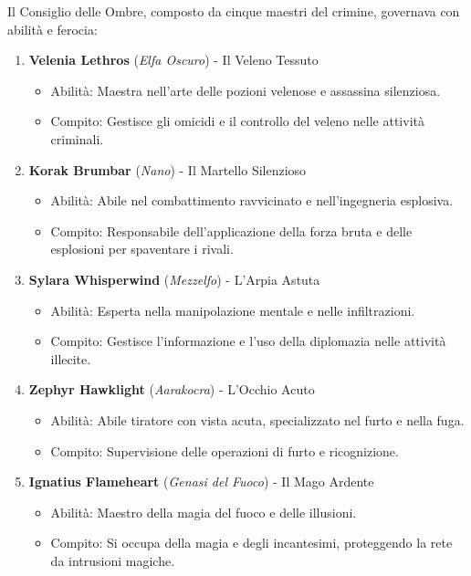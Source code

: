 \documentclass{article}
\begin{document}
Il Consiglio delle Ombre, composto da cinque maestri del crimine, governava con abilità e ferocia:
\begin{enumerate}
  \item \textbf{Velenia Lethros} (\textit{Elfa Oscuro}) - Il Veleno Tessuto
    \begin{itemize}
      \item Abilità: Maestra nell'arte delle pozioni velenose e assassina silenziosa.
      \item Compito: Gestisce gli omicidi e il controllo del veleno nelle attività criminali.
    \end{itemize}
  
  \item \textbf{Korak Brumbar} (\textit{Nano}) - Il Martello Silenzioso
    \begin{itemize}
      \item Abilità: Abile nel combattimento ravvicinato e nell'ingegneria esplosiva.
      \item Compito: Responsabile dell'applicazione della forza bruta e delle esplosioni per spaventare i rivali.
    \end{itemize}
  
  \item \textbf{Sylara Whisperwind} (\textit{Mezzelfo}) - L'Arpia Astuta
    \begin{itemize}
      \item Abilità: Esperta nella manipolazione mentale e nelle infiltrazioni.
      \item Compito: Gestisce l'informazione e l'uso della diplomazia nelle attività illecite.
    \end{itemize}
  
  \item \textbf{Zephyr Hawklight} (\textit{Aarakocra}) - L'Occhio Acuto
    \begin{itemize}
      \item Abilità: Abile tiratore con vista acuta, specializzato nel furto e nella fuga.
      \item Compito: Supervisione delle operazioni di furto e ricognizione.
    \end{itemize}
  
  \item \textbf{Ignatius Flameheart} (\textit{Genasi del Fuoco}) - Il Mago Ardente
    \begin{itemize}
      \item Abilità: Maestro della magia del fuoco e delle illusioni.
      \item Compito: Si occupa della magia e degli incantesimi, proteggendo la rete da intrusioni magiche.
    \end{itemize}
\end{enumerate}
\end{document}
